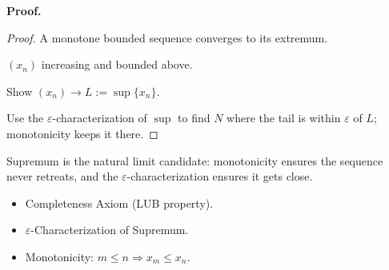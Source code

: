 \noindent
\textbf{Proof.}
\begin{proof}
\Claim A monotone bounded sequence converges to its extremum.

\Given $(x_n)$ increasing and bounded above.

\Goal Show $(x_n) \to L := \sup\{x_n\}$.

\Strategy Use the $\varepsilon$-characterization of $\sup$ to find $N$ where
the tail is within $\varepsilon$ of $L$; monotonicity keeps it there.

\medskip






\end{proof}

\begin{remark*}
Supremum is the natural limit candidate: monotonicity ensures the sequence
never retreats, and the $\varepsilon$-characterization ensures it gets close.
\end{remark*}

\begin{remark*}[Dependencies]
\begin{itemize}
  \item Completeness Axiom (LUB property).
  \item $\varepsilon$-Characterization of Supremum.
  \item Monotonicity: $m \le n \Rightarrow x_m \le x_n$.
\end{itemize}
\end{remark*}
